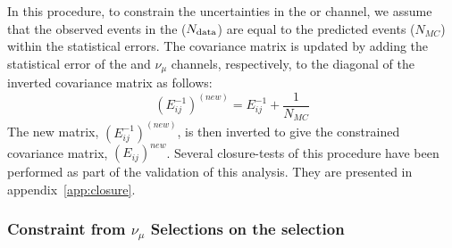 In this procedure, to constrain the uncertainties in the \npsel or \zpsel channel, we assume that the observed events in the \numu ($N_{\rm data}$) are equal to the predicted events ($N_{MC}$) within the statistical errors. The covariance matrix is updated by adding the statistical error of the \zpsel and $\nu_\mu$ channels, respectively, to the diagonal of the inverted covariance matrix as follows:
\begin{equation}
    (E_{ij}^{-1})^{(new)} = E_{ij}^{-1} + \frac{1}{N_{MC}} 
\end{equation}
The new matrix, $(E_{ij}^{-1})^{(new)}$, is then inverted to give the constrained covariance matrix, $(E_{ij})^{new}$.
Several closure-tests of this procedure have been performed as part of the validation of this analysis. They are presented in appendix~\ref{app:closure}. 


\subsubsection{Constraint from $\nu_\mu$ Selections on the \npsel selection}
\label{subsec:constraintfromnumu}


